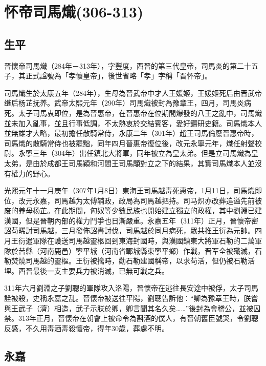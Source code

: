 
\section{怀帝司馬熾\tiny(306-313)}

\subsection{生平}

晉懷帝司馬熾（284年－313年），字豐度，西晉的第三代皇帝，司馬炎的第二十五子，其正式諡號為「孝懷皇帝」，後世省略「孝」字稱「晋怀帝」。

司馬熾生於太康五年（284年），生母為晉武帝中才人王媛姬，王媛姬死后由晋武帝继后杨芷抚养。武帝太熙元年（290年）司馬熾被封為豫章王，四月，司馬炎病死。太子司馬衷即位，是為晉惠帝，在晉惠帝在位期間爆發的八王之亂中，司馬熾並未加入亂事，並且行事低調，不太熱衷於交結賓客，愛好鑽研史籍。司馬熾本人並無雄才大略，最初擔任散騎常侍，永康二年（301年）趙王司馬倫廢晉惠帝時，司馬熾的散騎常侍也被罷黜，同年四月晉惠帝復位後，改元永寧元年，熾任射聲校尉。永寧三年（304年）出任鎮北大將軍，同年被立為皇太弟。但是立司馬熾為皇太弟，是由於成都王司馬穎和河間王司馬顒對立之下的結果，其實司馬熾本人並沒有權力的野心。

光熙元年十一月庚午（307年1月8日）東海王司馬越毒死惠帝，1月11日，司馬熾即位，改元永嘉，司馬越为太傅辅政，政局為司馬越把持。司马炽亦改葬追谥先前被废的养母杨芷。在此期間，匈奴等少數民族也開始建立獨立的政權，其中劉淵已建漢國，但是晉朝內部的權力鬥爭也日漸嚴重。永嘉五年（311年）正月，晉懷帝密詔苟晞討司馬越，三月發佈詔書討伐，司馬越於同月病死，眾共推王衍為元帥。四月王衍遣軍隊在護送司馬越靈柩回到東海封國時，與漢國鎮東大將軍石勒的二萬軍隊於苦縣（河南鹿邑）寧平城（河南省鄲城縣東寧平鄉）作戰，晋军全被殲滅，石勒焚燒司馬越的靈樞。王衍被擒時，勸石勒建國稱帝，以求苟活，但仍被石勒活埋。西晉最後一支主要兵力被消滅，已無可戰之兵。

311年六月劉淵之子劉聰的軍隊攻入洛陽，晉懷帝在逃往長安途中被俘，太子司馬詮被殺，史稱永嘉之乱。晉懷帝被送往平陽，劉聰告訴他：“卿為豫章王時，朕嘗與王武子（濟）相造，武子示朕於卿，卿言聞其名久矣……”後封為會稽公，並被囚禁。313年正月，晉懷帝在朝會上被命令為斟酒的僕人，有晉朝舊臣號哭，令劉聰反感，不久用毒酒毒殺懷帝，得年30歲，葬處不明。

\subsection{永嘉}

